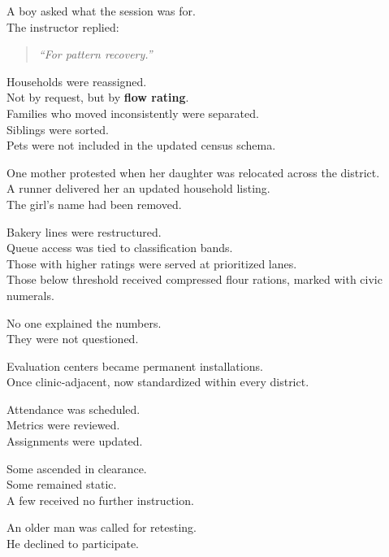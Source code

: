 \documentclass[12pt]{article}
\begin{document}
A boy asked what the session was for.\\
The instructor replied:

\begin{quote}
\textit{“For pattern recovery.”}
\end{quote}

\vspace{1em}

Households were reassigned.\\
Not by request, but by \textbf{flow rating}.\\
Families who moved inconsistently were separated.\\
Siblings were sorted.\\
Pets were not included in the updated census schema.

One mother protested when her daughter was relocated across the district.\\
A runner delivered her an updated household listing.\\
The girl’s name had been removed.

\vspace{1em}

Bakery lines were restructured.\\
Queue access was tied to classification bands.\\
Those with higher ratings were served at prioritized lanes.\\
Those below threshold received compressed flour rations, marked with civic numerals.

No one explained the numbers.\\
They were not questioned.

\vspace{1em}

Evaluation centers became permanent installations.\\
Once clinic-adjacent, now standardized within every district.

Attendance was scheduled.\\
Metrics were reviewed.\\
Assignments were updated.

Some ascended in clearance.\\
Some remained static.\\
A few received no further instruction.

\vspace{1em}

An older man was called for retesting.\\
He declined to participate.
\end{document}
